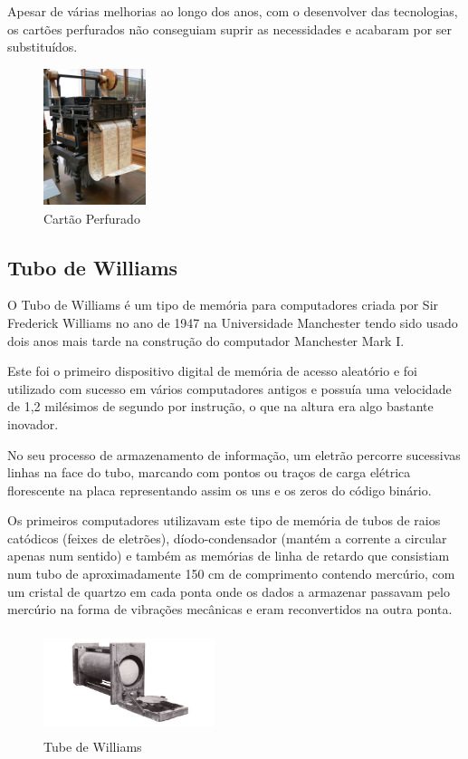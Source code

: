 \documentclass{report}
\begin{document}
		Apesar de várias melhorias ao longo dos anos, com o desenvolver das tecnologias, os cartões perfurados não conseguiam suprir as necessidades e acabaram por ser substituídos.
		
		\begin{figure}[h]
		\centering
		\includegraphics[width=3cm, height=4cm]{cartaoperfurado.jpg}
		\caption{Cartão Perfurado}
		\end{figure}
\newpage

		\subsection{Tubo de Williams}
		O Tubo de Williams é um tipo de memória para computadores criada por Sir Frederick Williams no ano de 1947 na Universidade Manchester tendo sido usado dois anos mais tarde na construção do computador Manchester Mark I.
	
	Este foi o primeiro dispositivo digital de memória de acesso aleatório e foi utilizado com sucesso em vários computadores antigos e possuía uma velocidade de 1,2 milésimos de segundo por instrução, o que na altura era algo bastante inovador.
	
	No seu processo de armazenamento de informação, um eletrão percorre sucessivas linhas na face do tubo, marcando com pontos ou traços de carga elétrica florescente na placa representando assim os uns e os zeros do código binário.
	
	Os primeiros computadores utilizavam este tipo de memória de tubos de raios catódicos (feixes de eletrões), díodo-condensador (mantém a corrente a circular apenas num sentido) e também as memórias de linha de retardo que consistiam num tubo de aproximadamente 150 cm de comprimento contendo mercúrio, com um cristal de quartzo em cada ponta onde os dados a armazenar passavam pelo mercúrio na forma de vibrações mecânicas e eram reconvertidos na outra ponta.
\vspace{1mm}

	\begin{figure}[h]
		\centering
		\includegraphics[width=5cm, height=3cm]{williamstube.jpg}
		\caption{Tube de Williams}
		\end{figure}	
\newpage
\end{document}
